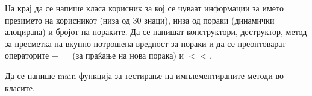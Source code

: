 \documentclass[12pt,a4paper]{exam}
\begin{document}
\begin{questions}
На крај да се напише класа корисник за кој се чуваат информации за името
презимето на корисникот (низа од 30 знаци), низа од пораки (динамички алоцирана)
и бројот на пораките. Да се напишат конструктори, деструктор,
метод за пресметка на вкупно потрошена вредност за пораки и да се преоптоварат
операторите $+=$ (за праќање на нова порака) и $<<$.

Да се напише main функција за тестирање на имплементираните методи во класите.

\end{questions}
\end{document}
